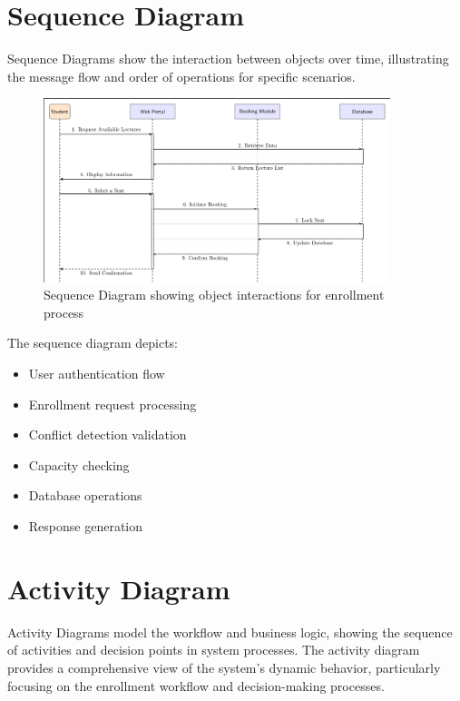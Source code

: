 \section{Sequence Diagram}

Sequence Diagrams show the interaction between objects over time, illustrating the message flow and order of operations for specific scenarios.

\begin{figure}[htbp]
    \centering
    \includegraphics[width=0.9\textwidth,height=0.7\textheight,keepaspectratio]{images/Sequence Diagram.png}
    \caption{Sequence Diagram showing object interactions for enrollment process}
    \label{fig:sequence}
\end{figure}

The sequence diagram depicts:
\begin{itemize}[leftmargin=*]
    \item User authentication flow
    \item Enrollment request processing
    \item Conflict detection validation
    \item Capacity checking
    \item Database operations
    \item Response generation
\end{itemize}

\section{Activity Diagram}

Activity Diagrams model the workflow and business logic, showing the sequence of activities and decision points in system processes. The activity diagram provides a comprehensive view of the system's dynamic behavior, particularly focusing on the enrollment workflow and decision-making processes.

